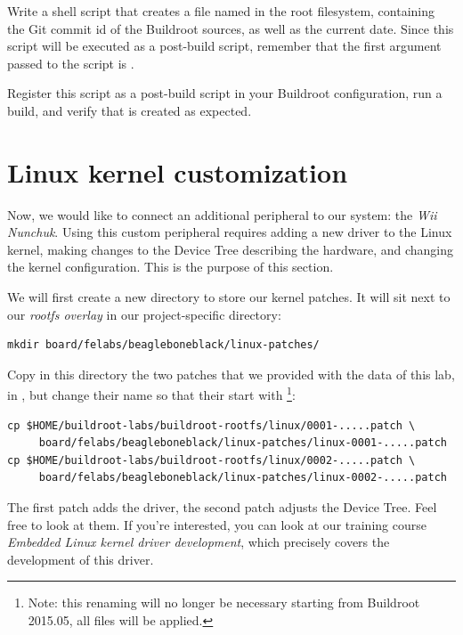 Write a shell script that creates a file named  in
the root filesystem, containing the Git commit id of the Buildroot
sources, as well as the current date. Since this script will be
executed as a post-build script, remember that the first argument
passed to the script is .

Register this script as a post-build script in your Buildroot
configuration, run a build, and verify that  is
created as expected.

\section{Linux kernel customization}

Now, we would like to connect an additional peripheral to our system:
the {\em Wii Nunchuk}. Using this custom peripheral requires adding a
new driver to the Linux kernel, making changes to the Device Tree
describing the hardware, and changing the kernel configuration. This
is the purpose of this section.

We will first create a new directory to store our kernel patches. It
will sit next to our {\em rootfs overlay} in our project-specific
directory:

\begin{verbatim}
mkdir board/felabs/beagleboneblack/linux-patches/
\end{verbatim}

Copy in this directory the two patches that we provided with the data
of this lab, in ,
but change their name so that their start with
\footnote{Note: this renaming will no longer be necessary
  starting from Buildroot 2015.05, all  files will be
  applied.}:

\begin{verbatim}
cp $HOME/buildroot-labs/buildroot-rootfs/linux/0001-.....patch \
     board/felabs/beagleboneblack/linux-patches/linux-0001-.....patch
cp $HOME/buildroot-labs/buildroot-rootfs/linux/0002-.....patch \
     board/felabs/beagleboneblack/linux-patches/linux-0002-.....patch
\end{verbatim}

The first patch adds the driver, the second patch adjusts the Device
Tree. Feel free to look at them. If you're interested, you can look at
our training course {\em Embedded Linux kernel driver development},
which precisely covers the development of this driver.


